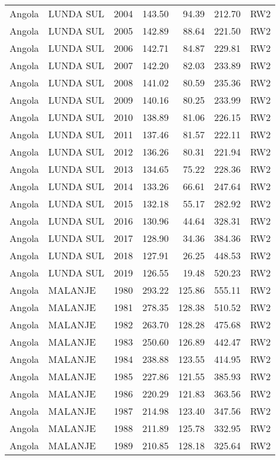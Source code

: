 \begin{longtable}{lllrrrl}
  Angola & LUNDA SUL & 2004 & 143.50 & 94.39 & 212.70 & RW2 \\ 
  Angola & LUNDA SUL & 2005 & 142.89 & 88.64 & 221.50 & RW2 \\ 
  Angola & LUNDA SUL & 2006 & 142.71 & 84.87 & 229.81 & RW2 \\ 
  Angola & LUNDA SUL & 2007 & 142.20 & 82.03 & 233.89 & RW2 \\ 
  Angola & LUNDA SUL & 2008 & 141.02 & 80.59 & 235.36 & RW2 \\ 
  Angola & LUNDA SUL & 2009 & 140.16 & 80.25 & 233.99 & RW2 \\ 
  Angola & LUNDA SUL & 2010 & 138.89 & 81.06 & 226.15 & RW2 \\ 
  Angola & LUNDA SUL & 2011 & 137.46 & 81.57 & 222.11 & RW2 \\ 
  Angola & LUNDA SUL & 2012 & 136.26 & 80.31 & 221.94 & RW2 \\ 
  Angola & LUNDA SUL & 2013 & 134.65 & 75.22 & 228.36 & RW2 \\ 
  Angola & LUNDA SUL & 2014 & 133.26 & 66.61 & 247.64 & RW2 \\ 
  Angola & LUNDA SUL & 2015 & 132.18 & 55.17 & 282.92 & RW2 \\ 
  Angola & LUNDA SUL & 2016 & 130.96 & 44.64 & 328.31 & RW2 \\ 
  Angola & LUNDA SUL & 2017 & 128.90 & 34.36 & 384.36 & RW2 \\ 
  Angola & LUNDA SUL & 2018 & 127.91 & 26.25 & 448.53 & RW2 \\ 
  Angola & LUNDA SUL & 2019 & 126.55 & 19.48 & 520.23 & RW2 \\ 
  Angola & MALANJE & 1980 & 293.22 & 125.86 & 555.11 & RW2 \\ 
  Angola & MALANJE & 1981 & 278.35 & 128.38 & 510.52 & RW2 \\ 
  Angola & MALANJE & 1982 & 263.70 & 128.28 & 475.68 & RW2 \\ 
  Angola & MALANJE & 1983 & 250.60 & 126.89 & 442.47 & RW2 \\ 
  Angola & MALANJE & 1984 & 238.88 & 123.55 & 414.95 & RW2 \\ 
  Angola & MALANJE & 1985 & 227.86 & 121.55 & 385.93 & RW2 \\ 
  Angola & MALANJE & 1986 & 220.29 & 121.83 & 363.56 & RW2 \\ 
  Angola & MALANJE & 1987 & 214.98 & 123.40 & 347.56 & RW2 \\ 
  Angola & MALANJE & 1988 & 211.89 & 125.78 & 332.95 & RW2 \\ 
  Angola & MALANJE & 1989 & 210.85 & 128.18 & 325.64 & RW2 \\ 

\end{longtable}
